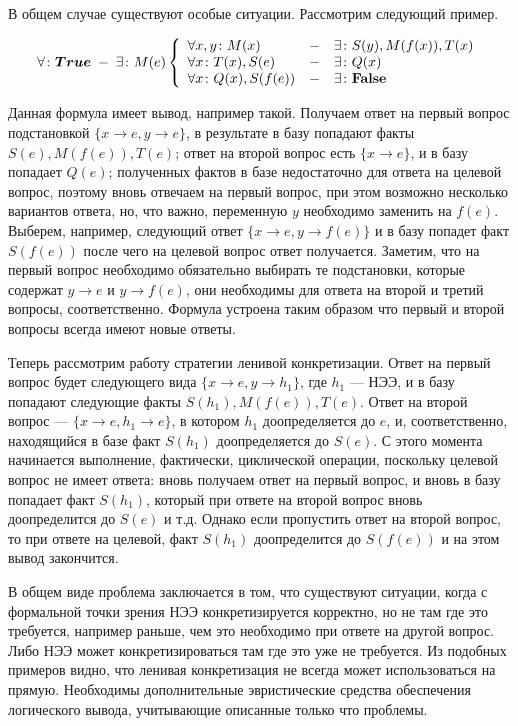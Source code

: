 В общем случае существуют особые ситуации. Рассмотрим следующий пример.
\begin{example}[]\label{example:uhe1}
$$\forall\colon\boldsymbol{True} \; - \; \exists\colon M(e) \left\{
\begin{array}{lcl}
 \forall x,y\colon M(x) & - & \exists\colon S(y),M(f(x)),T(x) \\
 \forall x \colon T(x),S(e) & - & \exists\colon Q(x) \\
 \forall x \colon Q(x),S(f(e)) & - & \exists\colon\textbf{False}
\end{array}
\right.$$

Данная формула имеет вывод, например такой. Получаем ответ на первый вопрос подстановкой $\{ x\rightarrow e, y\rightarrow e \}$, в результате в базу попадают факты $S(e),M(f(e)),T(e)$; ответ на второй вопрос есть $\{ x \rightarrow e\}$, и в базу попадает $Q(e)$; полученных фактов в базе недостаточно для ответа на целевой вопрос, поэтому вновь отвечаем на первый вопрос, при этом возможно несколько вариантов ответа, но, что важно, переменную $y$ необходимо заменить на $f(e)$. Выберем, например, следующий ответ $\{x \rightarrow e, y \rightarrow f(e) \}$ и в базу попадет факт $S(f(e))$ после чего на целевой вопрос ответ получается. Заметим, что на первый вопрос необходимо обязательно выбирать те подстановки, которые содержат $y \rightarrow e$ и $y \rightarrow f(e)$, они необходимы для ответа на второй и третий вопросы, соответственно. Формула устроена таким образом что первый и второй вопросы всегда имеют новые ответы.

Теперь рассмотрим работу стратегии ленивой конкретизации. Ответ на первый вопрос будет следующего вида $\{ x\rightarrow e, y\rightarrow h_1 \}$, где $h_1$ --- НЭЭ, и в базу попадают следующие факты $S(h_1),M(f(e)),T(e)$. Ответ на второй вопрос --- $\{ x\rightarrow e, h_1\rightarrow e \}$, в котором $h_1$ доопределяется до $e$, и, соответственно, находящийся в базе факт $S(h_1)$ доопределяется до $S(e)$. С этого момента начинается выполнение, фактически, циклической операции, поскольку целевой вопрос не имеет ответа: вновь получаем ответ на первый вопрос, и вновь в базу попадает факт $S(h_1)$, который при ответе на второй вопрос вновь доопределится до $S(e)$ и т.д. Однако если пропустить ответ на второй вопрос, то при ответе на целевой, факт $S(h_1)$ доопределится до $S(f(e))$ и на этом вывод закончится.
\end{example}


В общем виде проблема заключается в том, что существуют ситуации, когда с формальной точки зрения НЭЭ конкретизируется корректно, но не там где это требуется, например раньше, чем это необходимо при ответе на другой вопрос. Либо НЭЭ может конкретизироваться там где это уже не требуется. Из подобных примеров видно, что ленивая конкретизация не всегда может использоваться на прямую. Необходимы дополнительные эвристические средства обеспечения логического вывода, учитывающие описанные только что проблемы.

